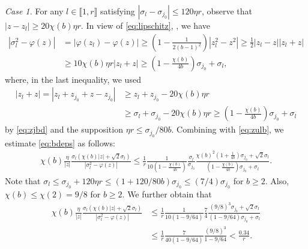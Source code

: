 \documentclass[reqno]{amsart}
\theoremstyle{plain}
\theoremstyle{definition}
\begin{document}
\emph{Case 1.} For any $l \in \llbracket 1, r\rrbracket$ satisfying $|\sigma_l-\sigma_{j_0}| \le 120 \eta r$,  observe that $|z-z_l| \ge 20 \chi(b) \eta r$. In view of \eqref{eq:lipschitz}, , we have
\begin{align*}
|\sigma_l^2 - \varphi(z)| &= |\varphi(z_l) - \varphi(z)| \ge \left(1-\frac{1}{2(b-1)^2} \right) |z_l^2 - z^2| \ge \frac{1}{2}|z_l-z| |z_l+z|\\
&\ge 10\chi(b)\eta r |z_l + z|\ge \left(1-\frac{\chi(b)}{4b} \right) \sigma_{j_0} +\sigma_l,%
\end{align*}
where, in the last inequality, we used 
\begin{align*}
|z_l+z| =|z_l + z_{j_0} +z-z_{j_0}| &\ge z_l + z_{j_0} - 20\chi(b) \eta r \\
&\ge  \sigma_l + \sigma_{j_0} - 20\chi(b) \eta r \ge \left(1-\frac{\chi(b)}{4b} \right) \sigma_{j_0} +\sigma_l
\end{align*}
 by \eqref{eq:zjbd} and the supposition $\eta r \le {\sigma_{j_0}}/{80b}$.
Combining with \eqref{eq:zulb}, we estimate \eqref{eq:bdeps} as follows:
\begin{align*}
\chi(b)\frac{\eta}{|z|}\frac{\sigma_l (\chi(b) |z|+\sqrt{2}\sigma_l)}{|\sigma_l^2 - \varphi(z)|}\le \frac{1}{r} \frac{1}{10(1-\frac{\chi(b)}{4b})} \frac{\sigma_l}{\sigma_{j_0}} \frac{\chi(b)^2 (1+\frac{1}{4b}) \sigma_{j_0} + \sqrt{2}\sigma_l}{(1-\frac{\chi(b)}{4b}) \sigma_{j_0} +\sigma_l}.
\end{align*}
Note that $\sigma_l \le \sigma_{j_0}+120\eta r \le (1 + 120/80b) \sigma_{j_0} \le (7/4) \sigma_{j_0}$ for $b\ge 2$. Also, $\chi(b) \le \chi(2) = 9/8$ for $b\ge 2$. We further obtain that
\begin{align*}
\chi(b)\frac{\eta}{|z|}\frac{\sigma_l (\chi(b) |z|+\sqrt{2}\sigma_l)}{|\sigma_l^2 - \varphi(z)|}&\le \frac{1}{r} \frac{1}{10(1- 9/64)} \frac{7}{4}  \frac{(9/8)^3 \sigma_{j_0} + \sqrt 2 \sigma_l}{ (1- 9/64) \sigma_{j_0} + \sigma_l}\\
&\le \frac{1}{r} \frac{7}{40(1- 9/64)} \frac{(9/8)^3}{ 1- 9/64} < \frac{0.34}{ r}.
\end{align*}
\end{document}
